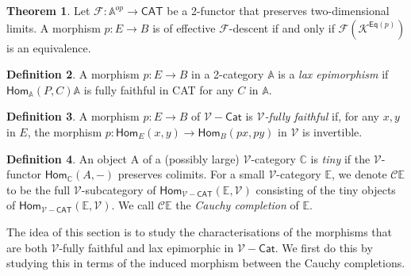 \documentclass{article}
\numberwithin{equation}{section}
\theoremstyle{definition}
\newtheorem{thm}{Theorem}[section]
\theoremstyle{definition}
\newtheorem{defn}[thm]{Definition}
\theoremstyle{remark}
\theoremstyle{remark}
\begin{document}
	\begin{thm}
		Let $ \mathcal{F}: \mathbb{A}^{op} \longrightarrow \textsf{CAT}$ be a 2-functor that preserves two-dimensional limits. 
		A morphism $ p: E \longrightarrow  B$ is of effective $ \mathcal{F}$-descent if and only if $ \mathcal{F}(\mathcal{K}^{ \textsf{Eq}(p)})$ is an equivalence.
	\end{thm}
	
	\begin{defn}
		A morphism $ p:E \longrightarrow  B$ in a 2-category $ \mathbb{A}$ is a \textit{lax epimorphism} if $ \textsf{Hom}_{ \mathbb{A}}(P,C) \mathbb{A}$ is fully faithful in \textsf{CAT} for any $ C$ in $ \mathbb{A}$.
	\end{defn}

	\begin{defn}
		A morphism $ p:E \longrightarrow B$ of $ \mathcal{V}- \textsf{Cat}$ is $ \mathcal{V}$\textit{-fully faithful} if, for any $ x,y$ in $ E$, the morphism $ p: \textsf{Hom}_{E}(x,y) \longrightarrow \textsf{Hom}_{B}(px,py)  $ in $ \mathcal{V}$ is invertible.

	\end{defn}
	
	\begin{defn} An object A of a (possibly large) $ \mathcal{V}$-category $ \mathbb{C}$ is \textit{tiny} if the $ \mathcal{V}$-functor $ \textsf{Hom}_{ \mathbb{C}}(A,-)  $ preserves colimits. 
		For a small $ \mathcal{V}$-category $ \mathbb{E}$, we denote $ \mathcal{C} \mathbb{E}$ to be the full $ \mathcal{V}$-subcategory of $ \textsf{Hom}_{  \mathcal{V}-\textsf{CAT}}( \mathbb{E}, \mathcal{V} )$ consisting of the tiny objects of $ \textsf{Hom}_{  \mathcal{V}-\textsf{CAT}}( \mathbb{E}, \mathcal{V} )$.
		We call $ \mathcal{C} \mathbb{E}$ the \textit{Cauchy completion} of $ \mathbb{E}$.
		
	\end{defn}
	
	The idea of this section is to study the characterisations of the morphisms that are both $ \mathcal{V}$-fully faithful and lax epimorphic in $ \mathcal{V}-\textsf{Cat}$. 
	We first do this by studying this in terms of the induced morphism between the Cauchy completions.\\
\end{document}
